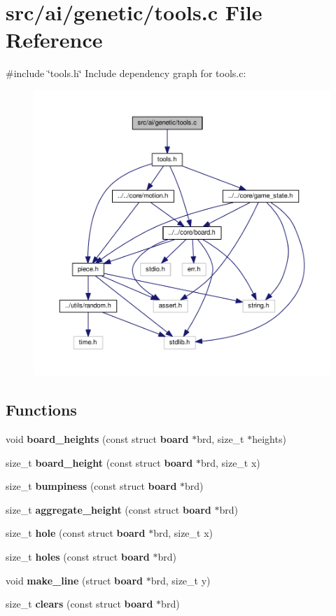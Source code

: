 \section{src/ai/genetic/tools.c File Reference}
\label{tools_8c}
{\ttfamily \#include \char`\"{}tools.\+h\char`\"{}}\newline
Include dependency graph for tools.\+c\+:
\nopagebreak
\begin{figure}[H]
\begin{center}
\leavevmode
\includegraphics[width=350pt]{tools_8c__incl}
\end{center}
\end{figure}
\subsection*{Functions}
\begin{DoxyCompactItemize}
\item 
void \textbf{ board\+\_\+heights} (const struct \textbf{ board} $\ast$brd, size\+\_\+t $\ast$heights)
\item 
size\+\_\+t \textbf{ board\+\_\+height} (const struct \textbf{ board} $\ast$brd, size\+\_\+t x)
\item 
size\+\_\+t \textbf{ bumpiness} (const struct \textbf{ board} $\ast$brd)
\item 
size\+\_\+t \textbf{ aggregate\+\_\+height} (const struct \textbf{ board} $\ast$brd)
\item 
size\+\_\+t \textbf{ hole} (const struct \textbf{ board} $\ast$brd, size\+\_\+t x)
\item 
size\+\_\+t \textbf{ holes} (const struct \textbf{ board} $\ast$brd)
\item 
void \textbf{ make\+\_\+line} (struct \textbf{ board} $\ast$brd, size\+\_\+t y)
\item 
size\+\_\+t \textbf{ clears} (const struct \textbf{ board} $\ast$brd)
\end{DoxyCompactItemize}


